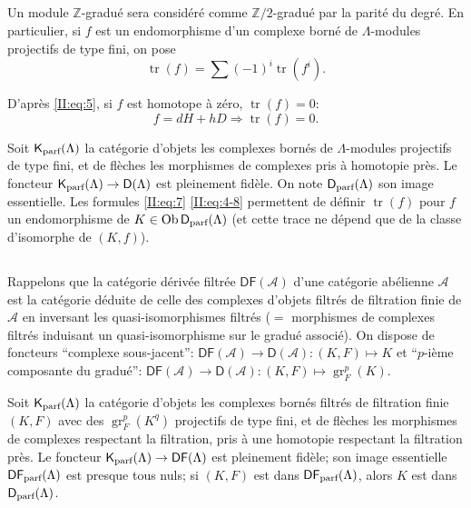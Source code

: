 \documentclass{book}
\DeclareMathOperator{\gr}{gr}
\DeclareMathOperator{\ob}{Ob}
\DeclareMathOperator{\tr}{tr}
\newcommand{\dZ}{\mathbb{Z}}
\newcommand{\sA}{\mathscr{A}}
\newcommand{\D}{\mathsf{D}}
\newcommand{\kparf}{\mathsf{K}_{\textnormal{parf}}}
\newcommand{\dparf}{\mathsf{D}_{\textnormal{parf}}}
\newcommand{\DF}{\mathsf{DF}}
\newcommand{\kfparf}{\mathsf{K}_{\textnormal{parf}}}
\newcommand{\dfparf}{\mathsf{DF}_{\textnormal{parf}}}
\begin{document}
\subsection{}\label{II:4-3}

Un module $\dZ$-gradué sera considéré comme $\dZ/2$-gradué par la 
parité du degré. En particulier, si $f$ est un endomorphisme d'un complexe 
borné de $\Lambda$-modules projectifs de type fini, on pose 
\begin{equation}\label{II:eq:7}
  \tr(f) = \sum (-1)^i \tr(f^i) \text{.}
\end{equation}

D'après \eqref{II:eq:5}, si $f$ est homotope à zéro, $\tr(f) = 0$: 
\begin{equation}\label{II:eq:8}
  f = d H + h D \Rightarrow \tr(f) = 0 \text{.}
\end{equation}

Soit $\kparf(\Lambda)$ la catégorie d'objets les complexes bornés de 
$\Lambda$-modules projectifs de type fini, et de flèches les morphismes de 
complexes pris à homotopie près. Le foncteur 
$\kparf(\Lambda)\to\D(\Lambda)$ est pleinement fidèle. On note 
$\dparf(\Lambda)$ son image essentielle. Les formules \eqref{II:eq:7} 
\eqref{II:eq:4-8} permettent de définir $\tr(f)$ pour $f$ un endomorphisme 
de $K\in\ob \dparf(\Lambda)$ (et cette trace ne dépend que de la classe 
d'isomorphe de $(K,f)$). 





\subsection{}\label{II:4-4}

Rappelons que la catégorie dérivée filtrée $\DF(\sA)$ d'une catégorie 
abélienne $\sA$ est la catégorie déduite de celle des complexes d'objets 
filtrés de filtration finie de $\sA$ en inversant les quasi-isomorphismes 
filtrés ($=$ morphismes de complexes filtrés induisant un quasi-isomorphisme 
sur le gradué associé). On dispose de foncteurs ``complexe sous-jacent'': 
$\DF(\sA)\to\D(\sA): (K,F)\mapsto K$ et ``$p$-ième composante du gradué'': 
$\DF(\sA)\to\D(\sA): (K,F)\mapsto \gr_F^p(K)$. 

Soit $\kfparf(\Lambda)$ la catégorie d'objets les complexes bornés 
filtrés de filtration finie $(K,F)$ avec des $\gr_F^p(K^q)$ projectifs de 
type fini, et de flèches les morphismes de complexes respectant la 
filtration, pris à une homotopie respectant la filtration près. Le foncteur 
$\kfparf(\Lambda)\to\DF(\Lambda)$ est pleinement fidèle; son image 
essentielle $\dfparf(\Lambda)$ est presque tous nuls; si $(K,F)$ est dans 
$\dfparf(\Lambda)$, alors $K$ est dans $\dparf(\Lambda)$. 
\end{document}
